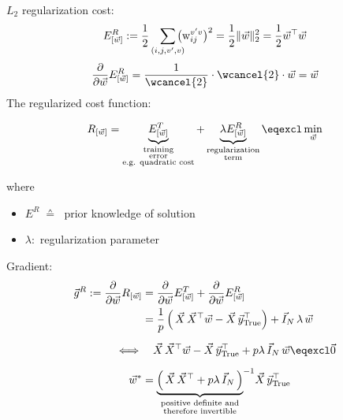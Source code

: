 \begin{frame}

$L_2$ regularization cost:
\begin{equation}
E^R_{[\vec w]} := \frac{1}{2} \sum_{(i, j, v', v)} 
			\kern-2ex
			\big( \mathrm{w}_{ij}^{v'v} \big)^2 = \frac{1}{2} \lVert \vec w \rVert_2^2 = \frac{1}{2} \vec w^\top \vec w 
\end{equation}
\renewcommand{\CancelColor}{\color{gray}}
\begin{equation}
\frac{\partial}{\partial \vec w} E^R_{[\vec w]} = \frac{1}{\wcancel{2}} \cdot \wcancel{2} \cdot \vec w = \vec w
\end{equation}
\pause
The regularized cost function:

\begin{equation}
	R_{[\vec{w}]} = \underbrace{ E_{[\vec{w}]}^T }_{
			\substack{\text{training} \\ \text{error} \\ \text{e.g. quadratic cost}}}
		+ \underbrace{ \lambda E_{[\vec{w}]}^R }_{
			\substack{\text{regularization} \\ \text{term}}}
		\eqexcl \min_{\vec w}
\end{equation}

where 
\begin{itemize}
	\item $E^R \; \corresponds \; $ prior knowledge of solution
	\item $\lambda:$ regularization parameter 
\end{itemize}
\end{frame}
\begin{frame}
Gradient:
\pause
\begin{align}
\vec g^R :=  \frac{\partial}{\partial \vec w} R_{[\vec w]}
&= \frac{\partial}{\partial \vec w} E^T_{[\vec w]} + \frac{\partial}{\partial \vec w} E^R_{[\vec w]}\\
&= \frac{1}{p} \left(\, \vec X \, \vec X^\top \vec w - \vec X\, \vec y_{\text{True}}^\top \right) + \vec I_N \, \lambda \, \vec w\\[2mm]
\iff& \quad \vec X \, \vec X^\top \vec w - \vec X\, \vec y_{\text{True}}^\top + p \lambda \, \vec I_N \,  \vec w \eqexcl \vec 0\\[2mm]
\vec w^* &=  {\underbrace{
\left(\, \vec X \, \vec X^\top + p \lambda \, \vec I_N \,  \right)
}_{
\substack{
\text{positive definite and}\\
\text{therefore invertible}\\
}
}
}^{-1} \vec X \, \vec y_{\mathrm{True}}^{\top}
\end{align}

\end{frame}
